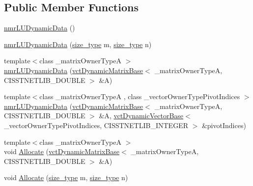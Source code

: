 \subsection*{Public Member Functions}
\begin{DoxyCompactItemize}
\item 
\hyperlink{classnmr_l_u_dynamic_data_a55c6a2b66f2b135e11c314f64833d26e}{nmr\+L\+U\+Dynamic\+Data} ()
\item 
\hyperlink{classnmr_l_u_dynamic_data_a05053cf47ae4af807c1c5171ecf2563a}{nmr\+L\+U\+Dynamic\+Data} (\hyperlink{classnmr_l_u_dynamic_data_a63259a289f8f94498b5102ce39722bbe}{size\+\_\+type} m, \hyperlink{classnmr_l_u_dynamic_data_a63259a289f8f94498b5102ce39722bbe}{size\+\_\+type} n)
\item 
{\footnotesize template$<$class \+\_\+matrix\+Owner\+Type\+A $>$ }\\\hyperlink{classnmr_l_u_dynamic_data_a03630a93e229576e73da3f9a959d4d12}{nmr\+L\+U\+Dynamic\+Data} (\hyperlink{classvct_dynamic_matrix_base}{vct\+Dynamic\+Matrix\+Base}$<$ \+\_\+matrix\+Owner\+Type\+A, C\+I\+S\+S\+T\+N\+E\+T\+L\+I\+B\+\_\+\+D\+O\+U\+B\+L\+E $>$ \&A)
\item 
{\footnotesize template$<$class \+\_\+matrix\+Owner\+Type\+A , class \+\_\+vector\+Owner\+Type\+Pivot\+Indices $>$ }\\\hyperlink{classnmr_l_u_dynamic_data_a2af25399a0b3ca245b54c956e8e96d87}{nmr\+L\+U\+Dynamic\+Data} (\hyperlink{classvct_dynamic_matrix_base}{vct\+Dynamic\+Matrix\+Base}$<$ \+\_\+matrix\+Owner\+Type\+A, C\+I\+S\+S\+T\+N\+E\+T\+L\+I\+B\+\_\+\+D\+O\+U\+B\+L\+E $>$ \&A, \hyperlink{classvct_dynamic_vector_base}{vct\+Dynamic\+Vector\+Base}$<$ \+\_\+vector\+Owner\+Type\+Pivot\+Indices, C\+I\+S\+S\+T\+N\+E\+T\+L\+I\+B\+\_\+\+I\+N\+T\+E\+G\+E\+R $>$ \&pivot\+Indices)
\item 
{\footnotesize template$<$class \+\_\+matrix\+Owner\+Type\+A $>$ }\\void \hyperlink{classnmr_l_u_dynamic_data_ad585ff877ac1bb95fb585c48f1a84f9b}{Allocate} (\hyperlink{classvct_dynamic_matrix_base}{vct\+Dynamic\+Matrix\+Base}$<$ \+\_\+matrix\+Owner\+Type\+A, C\+I\+S\+S\+T\+N\+E\+T\+L\+I\+B\+\_\+\+D\+O\+U\+B\+L\+E $>$ \&A)
\item 
void \hyperlink{classnmr_l_u_dynamic_data_aae8d1c2565653772a475222615cae23b}{Allocate} (\hyperlink{classnmr_l_u_dynamic_data_a63259a289f8f94498b5102ce39722bbe}{size\+\_\+type} m, \hyperlink{classnmr_l_u_dynamic_data_a63259a289f8f94498b5102ce39722bbe}{size\+\_\+type} n)
\item 

\end{DoxyCompactItemize}

